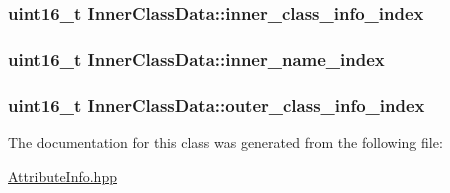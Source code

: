 \subsubsection[{\texorpdfstring{inner\+\_\+class\+\_\+info\+\_\+index}{inner_class_info_index}}]{\setlength{\rightskip}{0pt plus 5cm}uint16\+\_\+t Inner\+Class\+Data\+::inner\+\_\+class\+\_\+info\+\_\+index}\hypertarget{class_inner_class_data_a58436b7ecd12950e542f64ee18906c59}{}\label{class_inner_class_data_a58436b7ecd12950e542f64ee18906c59}
\subsubsection[{\texorpdfstring{inner\+\_\+name\+\_\+index}{inner_name_index}}]{\setlength{\rightskip}{0pt plus 5cm}uint16\+\_\+t Inner\+Class\+Data\+::inner\+\_\+name\+\_\+index}\hypertarget{class_inner_class_data_af11ac765a0638f41283f42eb51b9064a}{}\label{class_inner_class_data_af11ac765a0638f41283f42eb51b9064a}
\subsubsection[{\texorpdfstring{outer\+\_\+class\+\_\+info\+\_\+index}{outer_class_info_index}}]{\setlength{\rightskip}{0pt plus 5cm}uint16\+\_\+t Inner\+Class\+Data\+::outer\+\_\+class\+\_\+info\+\_\+index}\hypertarget{class_inner_class_data_a0370a0b4e7adc2b2524979040dc52f9d}{}\label{class_inner_class_data_a0370a0b4e7adc2b2524979040dc52f9d}


The documentation for this class was generated from the following file\+:\begin{DoxyCompactItemize}
\item 
\hyperlink{_attribute_info_8hpp}{Attribute\+Info.\+hpp}\end{DoxyCompactItemize}
